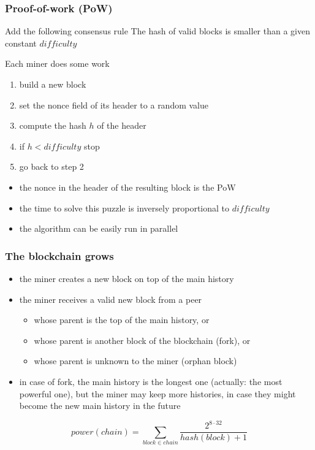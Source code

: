 \documentclass[11pt]{beamer}  %
\begin{document}
\begin{frame}\frametitle{Proof-of-work (PoW)}

  \begin{greenbox}{Add the following consensus rule}
    The hash of valid blocks is smaller than
    a given constant $\mathit{difficulty}$
  \end{greenbox}

  \bigskip

  \begin{greenbox}{Each miner does some work}
    \begin{enumerate}
    \item build a new block
    \item set the nonce field of its header to a random value
    \item compute the hash $h$ of the header
    \item if $h < \mathit{difficulty}$ stop
    \item go back to step 2
    \end{enumerate}
  \end{greenbox}

  \bigskip

  \begin{itemize}
  \item the nonce in the header of the resulting block is the PoW
  \item the time to solve this puzzle is inversely proportional to $\mathit{difficulty}$
  \item the algorithm can be easily run in parallel
  \end{itemize}

\end{frame}

\begin{frame}\frametitle{The blockchain grows}

  \begin{itemize}
  \item the miner creates a new block on top of the main history
  \item the miner receives a valid new block from a peer
    \begin{itemize}
    \item whose parent is the top of the main history, or
    \item whose parent is another block of the blockchain (fork), or
    \item whose parent is unknown to the miner (orphan block)
    \end{itemize}
  \item in case of fork, the main history is the longest one (actually: the most powerful one), but the miner may keep more histories,
    in case they might become the new main history in the future
  \end{itemize}

  \[
  \mathit{power}(\mathit{chain})=\sum_{\mathit{block}\in\mathit{chain}}\frac{2^{8\cdot 32}}{\mathit{hash}(\mathit{block})+1}
  \]
\end{frame}
\end{document}
